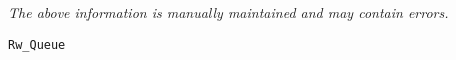 \label{pkg:rw\_queue}

{\tiny \it The above information is manually maintained and may contain errors.}
\begin{verbatim}
Rw_Queue
\end{verbatim}
